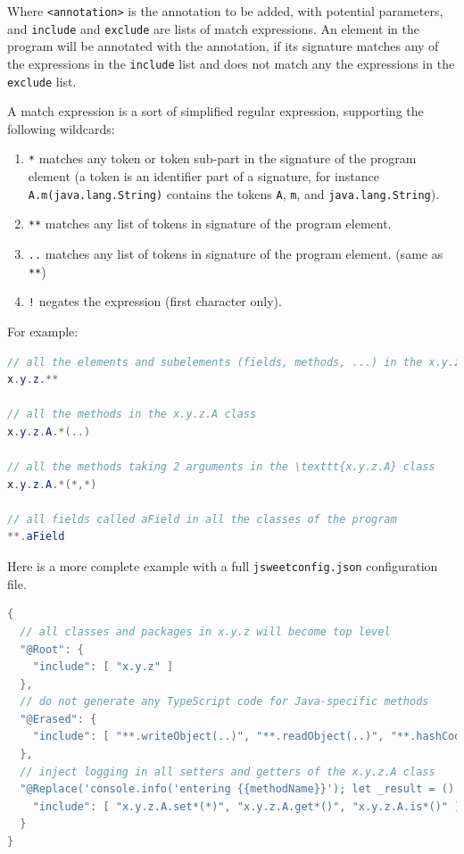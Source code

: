 \documentclass[a4paper]{report}
\begin{document}
Where \texttt{<annotation>} is the annotation to be added, with potential parameters, and \texttt{include} and \texttt{exclude} are lists of match expressions. An element in the program will be annotated with the annotation, if its signature matches any of the expressions in the \texttt{include} list and does not match any the expressions in the \texttt{exclude} list.

A match expression is a sort of simplified regular expression, supporting the following wildcards:

\begin{enumerate}
\item \texttt{*} matches any token or token sub-part in the signature of the program element (a token is an identifier part of a signature, for instance \texttt{A.m(java.lang.String)} contains the tokens \texttt{A}, \texttt{m}, and \texttt{java.lang.String}).
\item \texttt{**} matches any list of tokens in signature of the program element.
\item \texttt{..} matches any list of tokens in signature of the program element. (same as \texttt{**})
\item \texttt{!} negates the expression (first character only).
\end{enumerate}

\noindent
For example:

\begin{lstlisting}[language=Java]
// all the elements and subelements (fields, methods, ...) in the x.y.z package
x.y.z.**

// all the methods in the x.y.z.A class
x.y.z.A.*(..)

// all the methods taking 2 arguments in the \texttt{x.y.z.A} class
x.y.z.A.*(*,*)

// all fields called aField in all the classes of the program
**.aField
\end{lstlisting}

\noindent
Here is a more complete example with a full \texttt{jsweetconfig.json} configuration file.

\begin{lstlisting}[language=Java]
{
  // all classes and packages in x.y.z will become top level
  "@Root": {
    "include": [ "x.y.z" ]
  },
  // do not generate any TypeScript code for Java-specific methods
  "@Erased": {
    "include": [ "**.writeObject(..)", "**.readObject(..)", "**.hashCode(..)" ]
  },
  // inject logging in all setters and getters of the x.y.z.A class
  "@Replace('console.info('entering {{methodName}}'); let _result = () => { {{body}} }(); console.info('returning '+_result); return _result;')": {
    "include": [ "x.y.z.A.set*(*)", "x.y.z.A.get*()", "x.y.z.A.is*()" ]
  }
}
\end{lstlisting}
\end{document}
